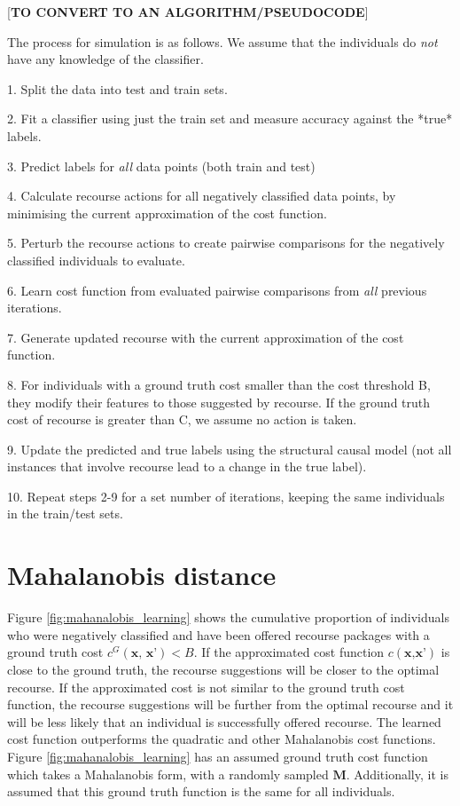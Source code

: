 [\textbf{TO CONVERT TO AN ALGORITHM/PSEUDOCODE}]

The process for simulation is as follows. We assume that the individuals do \textit{not} have any knowledge of the classifier.

1. Split the data into test and train sets.

2. Fit a classifier using just the train set and measure accuracy against the *true* labels.

3. Predict labels for \textit{all} data points (both train and test)

4. Calculate recourse actions for all negatively classified data points, by minimising the current approximation of the cost function.

5. Perturb the recourse actions to create pairwise comparisons for the negatively classified individuals to evaluate.

6. Learn cost function from evaluated pairwise comparisons from \textit{all} previous iterations.

7. Generate updated recourse with the current approximation of the cost function.

8. For individuals with a ground truth cost smaller than the cost threshold B, they modify their features to those suggested by recourse. If the ground truth cost of recourse is greater than C, we assume no action is taken.

9. Update the predicted and true labels using the structural causal model (not all instances that involve recourse lead to a change in the true label).

10. Repeat steps 2-9 for a set number of iterations, keeping the same individuals in the train/test sets.

\section{Mahalanobis distance}

Figure \ref{fig:mahanalobis_learning} shows the cumulative proportion of individuals who were negatively classified and have been offered recourse packages with a ground truth cost $c^G(\textbf{x, x'})<B$. If the approximated cost function $c(\textbf{x,x'})$ is close to the ground truth, the recourse suggestions will be closer to the optimal recourse. If the approximated cost is not similar to the ground truth cost function, the recourse suggestions will be further from the optimal recourse and it will be less likely that an individual is successfully offered recourse. The learned cost function outperforms the quadratic and other Mahalanobis cost functions. Figure \ref{fig:mahanalobis_learning} has an assumed ground truth cost function which takes a Mahalanobis form, with a randomly sampled $\textbf{M}$. Additionally, it is assumed that this ground truth function is the same for all individuals.

